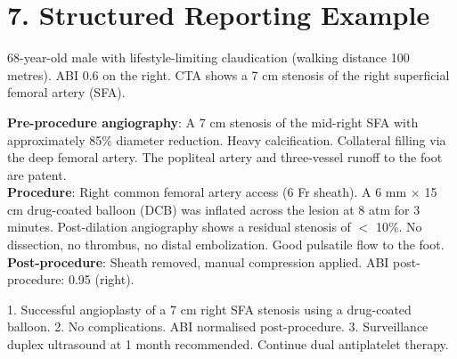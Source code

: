 \section{7. Structured Reporting Example}

\begin{testbox}[Indications:]
68-year-old male with lifestyle-limiting claudication (walking distance 100 metres). ABI 0.6 on the right. CTA shows a 7 cm stenosis of the right superficial femoral artery (SFA).
\end{testbox}
\begin{refbox}[Findings:]
\textbf{Pre-procedure angiography}: A 7 cm stenosis of the mid-right SFA with approximately 85\% diameter reduction. Heavy calcification. Collateral filling via the deep femoral artery. The popliteal artery and three-vessel runoff to the foot are patent.\\
\textbf{Procedure}: Right common femoral artery access (6 Fr sheath). A 6 mm $\times$ 15 cm drug-coated balloon (DCB) was inflated across the lesion at 8 atm for 3 minutes. Post-dilation angiography shows a residual stenosis of $<$ 10\%. No dissection, no thrombus, no distal embolization. Good pulsatile flow to the foot.\\
\textbf{Post-procedure}: Sheath removed, manual compression applied. ABI post-procedure: 0.95 (right).
\end{refbox}
\begin{pearlbox}[Impression:]
1. Successful angioplasty of a 7 cm right SFA stenosis using a drug-coated balloon.
2. No complications. ABI normalised post-procedure.
3. Surveillance duplex ultrasound at 1 month recommended. Continue dual antiplatelet therapy.
\end{pearlbox}

\clearpage

